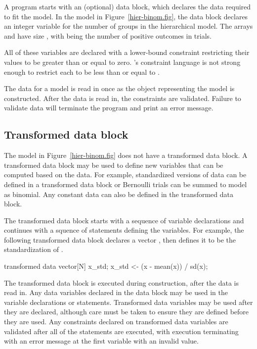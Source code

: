 \documentclass[article]{jss}
\begin{document}
A  program starts with an (optional) data block, which
declares the data required to fit the model.  In the model in
Figure~\ref{hier-binom.fig}, the data block declares an integer
variable  for the number of groups in the hierarchical model.
The arrays  and  have size , with 
being the number of positive outcomes in  trials.  

All of these variables are declared with a lower-bound constraint
restricting their values to be greater than or equal to zero.
's constraint language is not strong enough to restrict
each  to be less than or equal to .

The data for a  model is read in once as the
 object representing the model is constructed.  After
the data is read in, the constraints are validated.  Failure to
validate data will terminate the program and print an error message.

\subsection{Transformed data block}

The model in Figure~\ref{hier-binom.fig} does not have a transformed
data block.  A transformed data block may be used to define new
variables that can be computed based on the data.  For example,
standardized versions of data can be defined in a transformed
data block or Bernoulli trials can be summed to model as binomial.
Any constant data can also be defined in the transformed data block.

The transformed data block starts with a sequence of variable
declarations and continues with a squence of statements defining the
variables.  For example, the following transformed data block declares
a vector , then defines it to be the standardization of .
%
\begin{Code}
transformed data {
  vector[N] x_std;
  x_std <- (x - mean(x)) / sd(x);
}
\end{Code}

The transformed data block is executed during construction, after the
data is read in.  Any data variables declared in the data block may be
used in the variable declarations or statements.  Transformed data
variables may be used after they are declared, although care must be
taken to ensure they are defined before they are used.  Any
constraints declared on transformed data variables are validated after
all of the statements are executed, with execution terminating with an
error message at the first variable with an invalid value.
\end{document}
